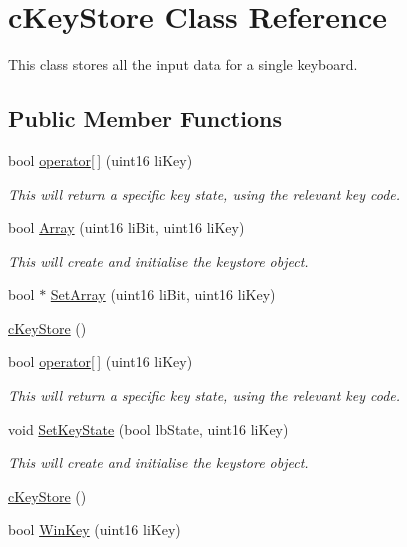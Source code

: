 \hypertarget{classc_key_store}{
\section{cKeyStore Class Reference}
\label{classc_key_store}
}


This class stores all the input data for a single keyboard.  


\subsection*{Public Member Functions}
\begin{DoxyCompactItemize}
\item 
bool \hyperlink{classc_key_store_a3b0392ad57c07042454ab913b80d4711}{operator\mbox{[}$\,$\mbox{]}} (uint16 liKey)
\begin{DoxyCompactList}\small\item\em This will return a specific key state, using the relevant key code. \item\end{DoxyCompactList}\item 
bool \hyperlink{classc_key_store_abb55c36bef948c191174425fdbed1e1d}{Array} (uint16 liBit, uint16 liKey)
\begin{DoxyCompactList}\small\item\em This will create and initialise the keystore object. \item\end{DoxyCompactList}\item 
bool $\ast$ \hyperlink{classc_key_store_a39709a00bc234a53e8ec1ebf75717196}{SetArray} (uint16 liBit, uint16 liKey)
\item 
\hyperlink{classc_key_store_a338766086dd09a48b8cefd33fb35bc7a}{cKeyStore} ()
\item 
bool \hyperlink{classc_key_store_a3b0392ad57c07042454ab913b80d4711}{operator\mbox{[}$\,$\mbox{]}} (uint16 liKey)
\begin{DoxyCompactList}\small\item\em This will return a specific key state, using the relevant key code. \item\end{DoxyCompactList}\item 
void \hyperlink{classc_key_store_a14fb60946fce2613b61539f479359934}{SetKeyState} (bool lbState, uint16 liKey)
\begin{DoxyCompactList}\small\item\em This will create and initialise the keystore object. \item\end{DoxyCompactList}\item 
\hyperlink{classc_key_store_a338766086dd09a48b8cefd33fb35bc7a}{cKeyStore} ()
\item 
bool \hyperlink{classc_key_store_adee7355062b92404928e9841144eeb3e}{WinKey} (uint16 liKey)
\end{DoxyCompactItemize}
